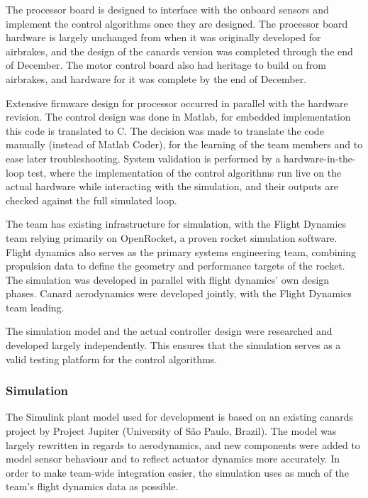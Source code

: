 The processor board is designed to interface with the onboard sensors and implement the control algorithms once they are designed.
The processor board hardware is largely unchanged from when it was originally developed for airbrakes, and the design of the canards version was completed through the end of December. The motor control board also had heritage to build on from airbrakes, and hardware for it was complete by the end of December.

Extensive firmware design for processor occurred in parallel with the hardware revision. 
The control design was done in Matlab, for embedded implementation this code is translated to C.
The decision was made to translate the code manually (instead of Matlab Coder), for the learning of the team members and to ease later troubleshooting.
System validation is performed by a hardware-in-the-loop test, where the implementation of the control algorithms run live on the actual hardware while interacting with the simulation, and their outputs are checked against the full simulated loop.

The team has existing infrastructure for simulation, with the Flight Dynamics team relying primarily on OpenRocket, a proven rocket simulation software. 
Flight dynamics also serves as the primary systems engineering team, combining propulsion data to define the geometry and performance targets of the rocket. 
The simulation was developed in parallel with flight dynamics' own design phases.
Canard aerodynamics were developed jointly, with the   Flight Dynamics team leading.

The simulation model and the actual controller design were researched and developed largely independently.
This ensures that the simulation serves as a valid testing platform for the control algorithms.

\subsubsection*{Simulation}
The Simulink plant model used for development is based on an existing canards project by Project Jupiter (University of São Paulo, Brazil). 
The model was largely rewritten in regards to aerodynamics, and new components were added to model sensor behaviour and to reflect actuator dynamics more accurately. 
In order to make team-wide integration easier, the simulation uses as much of the team's flight dynamics data as possible.


